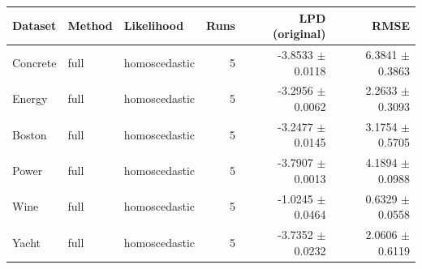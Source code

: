 \begin{tabular}{lllrrr}
\toprule
Dataset & Method & Likelihood & Runs & LPD (original) & RMSE \\
\midrule
Concrete & full & homoscedastic & 5 & -3.8533 $\pm$ 0.0118 & 6.3841 $\pm$ 0.3863 \\
Energy & full & homoscedastic & 5 & -3.2956 $\pm$ 0.0062 & 2.2633 $\pm$ 0.3093 \\
Boston & full & homoscedastic & 5 & -3.2477 $\pm$ 0.0145 & 3.1754 $\pm$ 0.5705 \\
Power & full & homoscedastic & 5 & -3.7907 $\pm$ 0.0013 & 4.1894 $\pm$ 0.0988 \\
Wine & full & homoscedastic & 5 & -1.0245 $\pm$ 0.0464 & 0.6329 $\pm$ 0.0558 \\
Yacht & full & homoscedastic & 5 & -3.7352 $\pm$ 0.0232 & 2.0606 $\pm$ 0.6119 \\
\bottomrule
\end{tabular}

